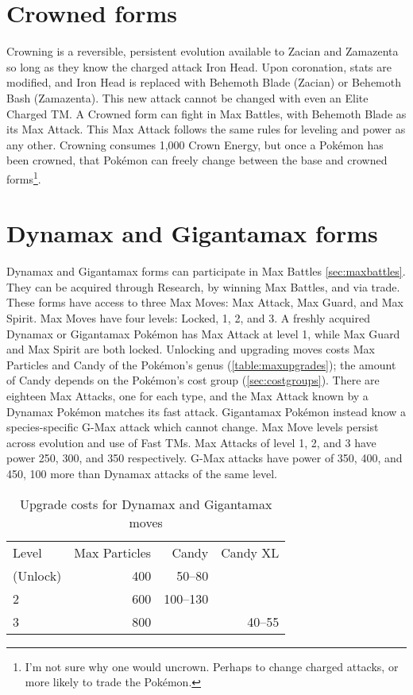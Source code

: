 \section{Crowned forms}
\label{sec:crowned}
Crowning is a reversible, persistent evolution available to Zacian and Zamazenta
 so long as they know the charged attack Iron Head.
Upon coronation, stats are modified, and Iron Head is replaced with Behemoth Blade (Zacian)
  or Behemoth Bash (Zamazenta).
This new attack cannot be changed with even an Elite Charged TM\@.
A Crowned form can fight in Max Battles, with Behemoth Blade as its Max Attack.
This Max Attack follows the same rules for leveling and power as any other.
Crowning consumes 1,000 Crown Energy, but once a Pokémon has been crowned,
  that Pokémon can freely change between the base and crowned
  forms\footnote{I'm not sure why one would uncrown. Perhaps to change charged attacks,
    or more likely to trade the Pokémon.}.


\section{Dynamax and Gigantamax forms}
\label{sec:dmaxgmax}
Dynamax and Gigantamax forms can participate in Max Battles \autoref{sec:maxbattles}.
They can be acquired through Research, by winning Max Battles, and via trade.
These forms have access to three Max Moves: Max Attack, Max Guard, and Max Spirit.
Max Moves have four levels: Locked, 1, 2, and 3.
A freshly acquired Dynamax or Gigantamax Pokémon has Max Attack at level 1, while Max Guard and Max Spirit are both locked.
Unlocking and upgrading moves costs Max Particles and Candy of the Pokémon's genus (\autoref{table:maxupgrades});
 the amount of Candy depends on the Pokémon's cost group (\autoref{sec:costgroups}).
There are eighteen Max Attacks, one for each type, and the Max Attack known by a Dynamax Pokémon matches its fast attack.
Gigantamax Pokémon instead know a species-specific G-Max attack which cannot change.
Max Move levels persist across evolution and use of Fast TMs.
Max Attacks of level 1, 2, and 3 have power 250, 300, and 350
  respectively.
G-Max attacks have power of 350, 400, and 450, 100 more than Dynamax attacks of the same level.
\begin{table}[ht]
\centering
\begin{tabular}{lrrr}
  Level & Max Particles & Candy & Candy XL\\
  \Midrule
  1 (Unlock) & 400 & 50--80 &\\
  2          & 600 & 100--130 &\\
  3          & 800 & & 40--55\\
\end{tabular}
\caption{Upgrade costs for Dynamax and Gigantamax moves}
\label{table:maxupgrades}
\end{table}



